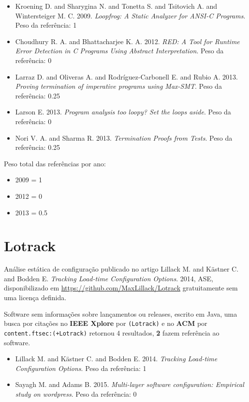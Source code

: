\begin{itemize}
\item Kroening D. and Sharygina N. and Tonetta S. and Tsitovich A. and Wintersteiger M. C.
      2009.
      {\it Loopfrog: A Static Analyzer for ANSI-C Programs}.
      Peso da referência: 1
\item Choudhury R. A. and Bhattacharjee K. A.
      2012.
      {\it RED: A Tool for Runtime Error Detection in C Programs Using Abstract Interpretation}.
      Peso da referência: 0
\item Larraz D. and Oliveras A. and Rodríguez-Carbonell E. and Rubio A.
      2013.
      {\it Proving termination of imperative programs using Max-SMT}.
      Peso da referência: 0.25
\item Larson E.
      2013.
      {\it Program analysis too loopy? Set the loops aside}.
      Peso da referência: 0
\item Nori V. A. and Sharma R.
      2013.
      {\it Termination Proofs from Tests}.
      Peso da referência: 0.25
\end{itemize}

Peso total das referências por ano:

\begin{itemize}
\item 2009 = 1
\item 2012 = 0
\item 2013 = 0.5
\end{itemize}


\section{Lotrack}

Análise estática de configuração
publicado no artigo
Lillack M. and K\"{a}stner C. and Bodden E.
{\it Tracking Load-time Configuration Options}.
2014,
ASE,
disponibilizado em \url{https://github.com/MaxLillack/Lotrack}
gratuitamente
sem uma licença definida.

Software sem informações sobre lançamentos ou releases,
escrito em Java,
uma busca por citações no {\bf IEEE Xplore} por
\texttt{(Lotrack)}
e no {\bf ACM} por
\texttt{content.ftsec:(+Lotrack)}
retornou
4 resultados,
{\bf 2} fazem referência ao software.

\begin{itemize}
\item Lillack M. and K\"{a}stner C. and Bodden E.
      2014.
      {\it Tracking Load-time Configuration Options}.
      Peso da referência: 1
\item Sayagh M. and Adams B.
      2015.
      {\it Multi-layer software configuration: Empirical study on wordpress}.
      Peso da referência: 0
\end{itemize}


